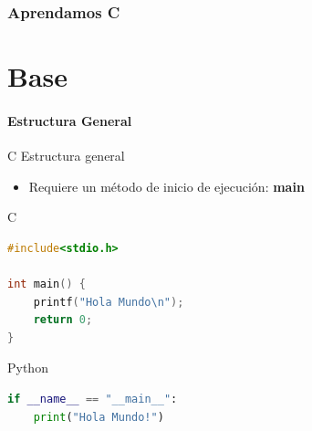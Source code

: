 \documentclass{beamer}
\begin{document}
%
%

\section{Aprendamos C}
\part{Base}
\subsection{Estructura General}
\begin{frame}[fragile]{C Estructura general}
\begin{itemize}
	\item Requiere un método de inicio de ejecución: \textbf{main}
\end{itemize}

\begin{exampleblock}{C}
\begin{lstlisting}[language=C,basicstyle=\scriptsize]
#include<stdio.h>

int main() {
	printf("Hola Mundo\n");
	return 0;
}
\end{lstlisting}
\end{exampleblock}
\begin{block}{Python}
	\begin{lstlisting}[language=Python,basicstyle=\scriptsize]
if __name__ == "__main__":
	print("Hola Mundo!")
	\end{lstlisting}
\end{block}
\end{frame}
\end{document}
